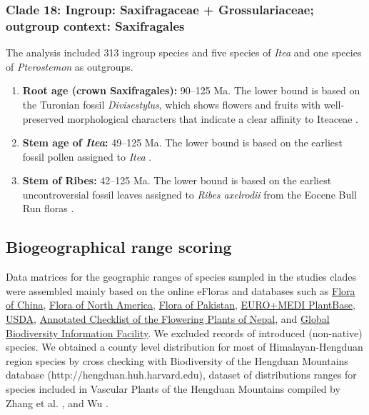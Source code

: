 \documentclass[10pt]{article}
\begin{document}
\subsubsection*{Clade 18: Ingroup: Saxifragaceae + Grossulariaceae;
  outgroup context: Saxifragales}

The analysis included 313 ingroup species and five species of
\textit{Itea} and one species of \textit{Pterostemon} as outgroups.

\begin{enumerate}
\item \textbf{Root age (crown Saxifragales):} 90--125 Ma. The lower
  bound is based on the Turonian fossil \textit{Divisestylus}, which
  shows flowers and fruits with well-preserved morphological
  characters that indicate a clear affinity to Iteaceae
  \citep{Hermsen2003}.

\item \textbf{Stem age of \textit{Itea}:} 49--125 Ma. The lower
  bound is based on the earliest fossil pollen assigned to \emph{Itea}
  \citep{Hermsen2013}.

\item \textbf{Stem of Ribes:} 42--125 Ma. The lower bound is based
  on the earliest uncontroversial fossil leaves assigned to
  \textit{Ribes axelrodii} from the Eocene Bull Run floras
  \citep{Hermsen2005}.
\end{enumerate}

\subsection*{Biogeographical range scoring}

Data matrices for the geographic ranges of species sampled in the
studies clades were assembled mainly based on the online eFloras and
databases such as
\href{http://www.efloras.org/flora_page.aspx?flora_id=2}{Flora of
  China}, \href{http://floranorthamerica.org}{Flora of North America},
\href{http://www.efloras.org/flora_page.aspx?flora_id=5}{Flora of
  Pakistan}, \href{http://www.emplantbase.org}{EURO+MEDI PlantBase},
\href{http://plants.usda.gov}{USDA},
\href{http://www.efloras.org/flora_page.aspx?flora_id=110}{Annotated
  Checklist of the Flowering Plants of Nepal}, and
\href{http://www.gbif.org}{Global Biodiversity Information
  Facility}. We excluded records of introduced (non-native)
species. We obtained a county level distribution for most of
Himalayan-Hengduan region species by cross checking with Biodiversity
of the Hengduan Mountains database (http://hengduan.huh.harvard.edu),
dataset of distributions ranges for species included in Vascular
Plants of the Hengduan Mountains compiled by Zhang et
al. \citep{Zhang2009}, and Wu \citep{Wu2008}.
\end{document}
